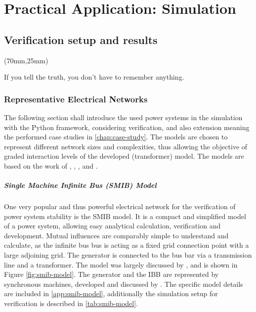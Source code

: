 
\begingroup
{}
\part{Practical Application: Simulation}

\endgroup

\chapter{Verification setup and results}

\begin{textblock*}{.7\textwidth}(70mm,25mm)
    \begin{fquote}
        If you tell the truth, you don't have to remember anything.
    \end{fquote}
\end{textblock*}

\section{Representative Electrical Networks}

The following section shall introduce the used power systems in the simulation with the Python framework, considering verification, and also extension meaning the performed case studies in \autoref{chap:case-study}. The models are chosen to represent different network sizes and complexities, thus allowing the objective of graded interaction levels of the developed (transformer) model. The models are based on the work of \textcite{machowskiPowerSystemDynamics2020}, \textcite{kundurPowerSystemStability2022}, \textcite{IEEEGuideLoad}, and \textcite{vancutsemTestSystemsVoltage2020}.

\subsubsection{Single Machine Infinite Bus (SMIB) Model}

One very popular and thus powerful electrical network for the verification of power system stability is the \acs{SMIB} model. It is a compact and simplified model of a power system, allowing easy analytical calculation, verification and development. Mutual influences are comparably simple to understand and calculate, as the infinite bus bus is acting as a fixed grid connection point with a large adjoining grid. The generator is connected to the bus bar via a transmission line and a transformer. The model was largely discussed by \textcite{kundurPowerSystemStability2022}, and is shown in Figure \ref{fig:smib-model}. The generator and the \acs{IBB} are represented by synchronous machines, developed and discussed by \textcite{kordowichPhysicsInformedMachine2023}. The specific model details are included in \autoref{app:smib-model}, additionally the simulation setup for verification is described in \autoref{tab:smib-model}.

